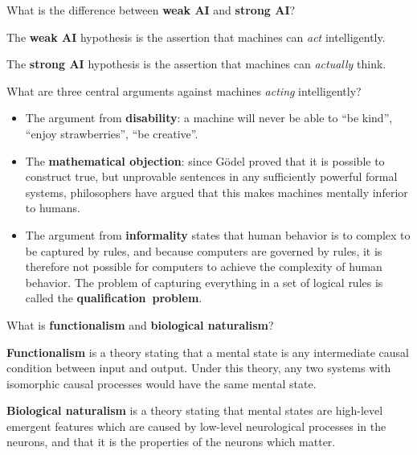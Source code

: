 
\begin{flashcard}[Question]{What is the difference between \textbf{weak AI} and \textbf{strong AI}?}
\begin{center}
The \textbf{weak AI} hypothesis is the assertion that machines can \textit{act} intelligently.

\medskip

The \textbf{strong AI} hypothesis is the assertion that machines can \textit{actually} think.
\end{center}
\end{flashcard}

\begin{flashcard}[Question]{What are three central arguments against machines \textit{acting} intelligently?}
\begin{itemize}
\item The argument from \textbf{disability}: a machine will never be able to ``be kind'', ``enjoy strawberries'', ``be creative''.
\item The \textbf{mathematical objection}: since Gödel proved that it is possible to construct true, but unprovable sentences in any sufficiently powerful formal systems, philosophers have argued that this makes machines mentally inferior to humans.
\item The argument from \textbf{informality} states that human behavior is to complex to be captured by rules, and because computers are governed by rules, it is therefore not possible for computers to achieve the complexity of human behavior. The problem of capturing everything in a set of logical rules is called the \textbf{qualification~problem}.
\end{itemize}
\end{flashcard}

\begin{flashcard}[Question]{What is \textbf{functionalism} and \textbf{biological naturalism}?}
\begin{center}
\textbf{Functionalism} is a theory stating that a mental state is any intermediate causal condition between input and output. Under this theory, any two systems with isomorphic causal processes would have the same mental state.

\medskip

\textbf{Biological naturalism} is a theory stating that mental states are high-level emergent features which are caused by low-level neurological processes in the neurons, and that it is the properties of the neurons which matter.
\end{center}
\end{flashcard}

